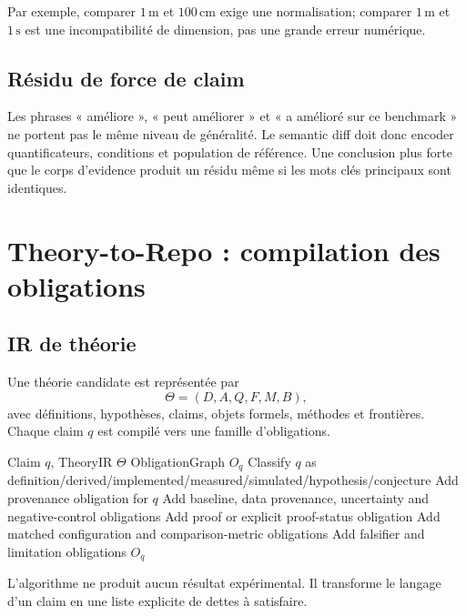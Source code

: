 Par exemple, comparer $1\,\mathrm{m}$ et $100\,\mathrm{cm}$ exige une normalisation; comparer $1\,\mathrm{m}$ et $1\,\mathrm{s}$ est une incompatibilité de dimension, pas une grande erreur numérique.

\section{Résidu de force de claim}

Les phrases « améliore », « peut améliorer » et « a amélioré sur ce benchmark » ne portent pas le même niveau de généralité. Le semantic diff doit donc encoder quantificateurs, conditions et population de référence. Une conclusion plus forte que le corps d'evidence produit un résidu même si les mots clés principaux sont identiques.

\chapter{Theory-to-Repo : compilation des obligations}

\section{IR de théorie}

Une théorie candidate est représentée par
\[
\Theta=(D,A,Q,F,M,B),
\]
avec définitions, hypothèses, claims, objets formels, méthodes et frontières. Chaque claim $q$ est compilé vers une famille d'obligations.

\begin{algorithm}
\caption{Compilation d'un claim scientifique}
\begin{algorithmic}[1]
\Require Claim $q$, TheoryIR $\Theta$
\Ensure ObligationGraph $O_q$
\State Classify $q$ as definition/derived/implemented/measured/simulated/hypothesis/conjecture
\State Add provenance obligation for $q$
  \State Add baseline, data provenance, uncertainty and negative-control obligations
\EndIf
{}
  \State Add proof or explicit proof-status obligation
\EndIf
{}
  \State Add matched configuration and comparison-metric obligations
\EndIf
\State Add falsifier and limitation obligations
\State \Return $O_q$
\end{algorithmic}
\end{algorithm}

L'algorithme ne produit aucun résultat expérimental. Il transforme le langage d'un claim en une liste explicite de dettes à satisfaire.

